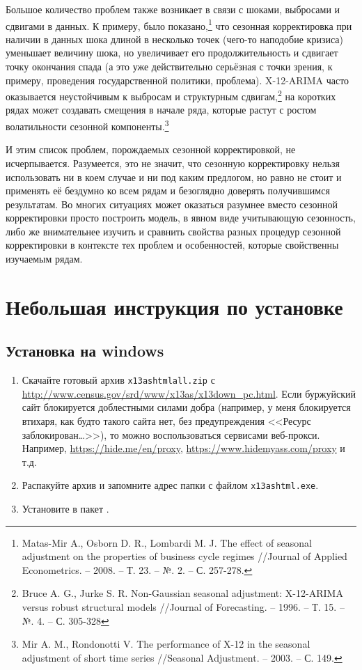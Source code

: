 \documentclass[final,pdftex]{../../template/epsilonj}\usepackage[]{graphicx}\usepackage[]{color}
\begin{document}
Большое количество проблем также возникает в связи с шоками, выбросами и сдвигами в данных. К примеру, было показано,\footnote{Matas-Mir A., Osborn D. R., Lombardi M. J. The effect of seasonal adjustment on the properties of business cycle regimes //Journal of Applied Econometrics. – 2008. – Т. 23. – №. 2. – С. 257-278.} что сезонная корректировка при наличии в данных шока длиной в несколько точек (чего-то наподобие кризиса) уменьшает величину шока, но увеличивает его продолжительность и сдвигает точку окончания спада (а это уже действительно серьёзная с точки зрения, к примеру, проведения государственной политики, проблема). X-12-ARIMA часто оказывается неустойчивым к выбросам и структурным сдвигам,\footnote{Bruce A. G., Jurke S. R. Non-Gaussian seasonal adjustment: X-12-ARIMA versus robust structural models //Journal of Forecasting. – 1996. – Т. 15. – №. 4. – С. 305-328} на коротких рядах может создавать смещения в начале ряда, которые растут с ростом волатильности сезонной компоненты.\footnote{Mir A. M., Rondonotti V. The performance of X-12 in the seasonal adjustment of short time series //Seasonal Adjustment. – 2003. – С. 149.}

И этим список проблем, порождаемых сезонной корректировкой, не исчерпывается. Разумеется, это не значит, что сезонную корректировку нельзя использовать ни в коем случае и ни под каким предлогом, но равно не стоит и применять её бездумно ко всем рядам и безоглядно доверять получившимся результатам. Во многих ситуациях может оказаться разумнее вместо сезонной корректировки просто построить модель, в явном виде учитывающую сезонность, либо же внимательнее изучить и сравнить свойства разных процедур сезонной корректировки в контексте тех проблем и особенностей, которые свойственны изучаемым рядам. 

\section{Небольшая инструкция по установке}


\subsection{Установка на windows}

\begin{enumerate}
\item Скачайте готовый архив \verb|x13ashtmlall.zip| с \url{http://www.census.gov/srd/www/x13as/x13down_pc.html}. Если буржуйский сайт блокируется доблестными силами добра (например, у меня блокируется втихаря, как будто такого сайта нет, без предупреждения <<Ресурс заблокирован\ldots>>), то можно воспользоваться сервисами веб-прокси. Например, \url{https://hide.me/en/proxy}, \url{https://www.hidemyass.com/proxy} и т.д.
\item Распакуйте архив и запомните адрес папки с файлом \verb|x13ashtml.exe|.
\item Установите в   пакет .
\end{enumerate}
\end{document}
